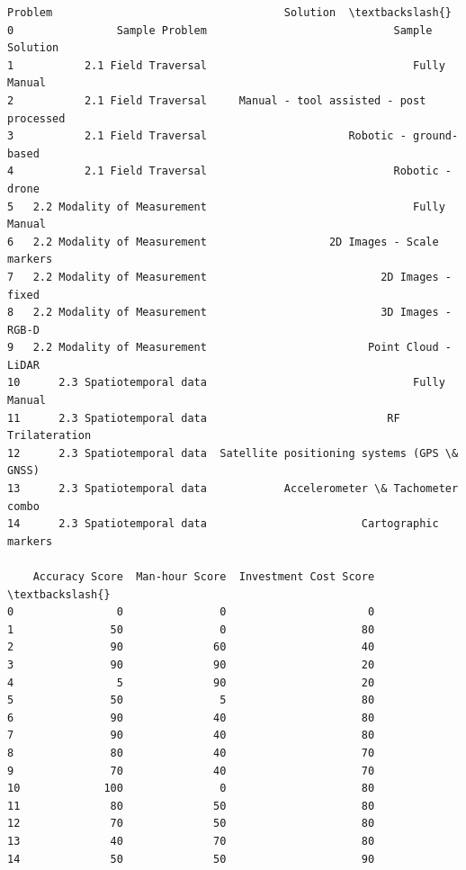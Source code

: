 \documentclass[11pt]{article}
\begin{document}
    
    \begin{Verbatim}[commandchars=\\\{\}]
                        Problem                                    Solution  \textbackslash{}
0                Sample Problem                             Sample Solution   
1           2.1 Field Traversal                                Fully Manual   
2           2.1 Field Traversal     Manual - tool assisted - post processed   
3           2.1 Field Traversal                      Robotic - ground-based   
4           2.1 Field Traversal                             Robotic - drone   
5   2.2 Modality of Measurement                                Fully Manual   
6   2.2 Modality of Measurement                   2D Images - Scale markers   
7   2.2 Modality of Measurement                           2D Images - fixed   
8   2.2 Modality of Measurement                           3D Images - RGB-D   
9   2.2 Modality of Measurement                         Point Cloud - LiDAR   
10      2.3 Spatiotemporal data                                Fully Manual   
11      2.3 Spatiotemporal data                            RF Trilateration   
12      2.3 Spatiotemporal data  Satellite positioning systems (GPS \& GNSS)   
13      2.3 Spatiotemporal data            Accelerometer \& Tachometer combo   
14      2.3 Spatiotemporal data                        Cartographic markers   

    Accuracy Score  Man-hour Score  Investment Cost Score  \textbackslash{}
0                0               0                      0   
1               50               0                     80   
2               90              60                     40   
3               90              90                     20   
4                5              90                     20   
5               50               5                     80   
6               90              40                     80   
7               90              40                     80   
8               80              40                     70   
9               70              40                     70   
10             100               0                     80   
11              80              50                     80   
12              70              50                     80   
13              40              70                     80   
14              50              50                     90   


\end{Verbatim}
\end{document}
